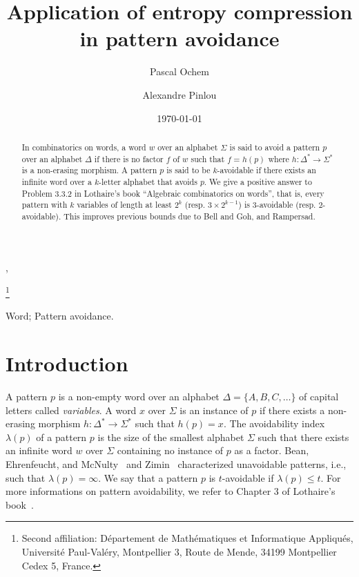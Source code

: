 \documentclass[]{elsart}
\date{\today}
\begin{document}
\begin{frontmatter}

  \title{Application of entropy compression\\ in pattern avoidance}
  
  \author{Pascal Ochem},
  \author{Alexandre Pinlou}
  \thanks[UPV]{Second affiliation: Département de Mathématiques et
    Informatique Appliqués, 
    Université Paul-Valéry, Montpellier 3, Route de Mende, 34199
    Montpellier Cedex 5, France.} 
  
  \address{LIRMM - Univ. Montpellier 2, CNRS - 161 rue Ada, 34095
    Montpellier Cedex 5, France} 

\begin{abstract}
  In combinatorics on words, a word $w$ over an alphabet $\Sigma$ is
  said to avoid a pattern $p$ over an alphabet $\Delta$ if there is no
  factor $f$ of $w$ such that $f= h(p)$ where $h: \Delta^*\to\Sigma^*$
  is a non-erasing morphism. A pattern $p$ is said to be $k$-avoidable
  if there exists an infinite word over a $k$-letter alphabet that
  avoids $p$. We give a positive answer to Problem 3.3.2 in Lothaire's
  book ``Algebraic combinatorics on words'', that is, every pattern
  with $k$ variables of length at least $2^k$ (resp.
  $3\times2^{k-1}$) is 3-avoidable (resp. 2-avoidable).  This improves
  previous bounds due to Bell and Goh, and Rampersad.
\end{abstract}

  \begin{keyword}
    Word; Pattern avoidance.
  \end{keyword}

\end{frontmatter}

\journal{}

\section{Introduction}\label{sec:intro}

A pattern $p$ is a non-empty word over an alphabet
$\Delta=\{A,B,C,\dots\}$ of capital letters called \emph{variables}.
A word $x$ over $\Sigma$ is an instance of $p$ if there exists a
non-erasing morphism $h: \Delta^*\to\Sigma^*$ such that $h(p)=x$. The
avoidability index $\lambda(p)$ of a pattern $p$ is the size of the
smallest alphabet $\Sigma$ such that there exists an infinite word $w$
over $\Sigma$ containing no instance of $p$ as a factor. Bean,
Ehrenfeucht, and McNulty~\cite{BEM79} and Zimin~\cite{Zimin}
characterized unavoidable patterns, i.e., such that
$\lambda(p)=\infty$. We say that a pattern $p$ is $t$-avoidable if
$\lambda(p)\le t$. For more informations on pattern avoidability, we
refer to Chapter 3 of Lothaire's book~\cite{Lothaire:2002}.
\end{document}
